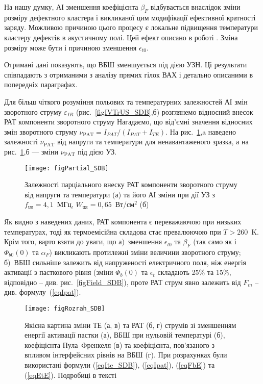 На нашу думку, АІ зменшення коефіцієнта $\beta_F$ відбувається внаслідок зміни розміру дефектного кластера і викликаної цим
модифікації ефективної кратності заряду.
Можливою причиною цього процесу є локальне підвищення температури кластеру дефектів в акустичному полі.
Цей ефект описано в роботі \cite{MirzadeJAP2011}.
Зміна розміру може бути і причиною зменшення $\epsilon_{t0}$.

Отримані дані показують, що ВБШ зменшується під дією УЗН.
Ці результати співпадають з отриманими з аналізу прямих гілок ВАХ і детально описаними в попередніх параграфах.

Для більш чіткого розуміння польових та температурних залежностей АІ змін зворотного струму $\varepsilon_{IR}$ (рис.~\ref{figIVTrUS_SDB},б)
розглянемо відносний внесок РАТ компоненти зворотного струму
Нагадаємо, що від'ємні значення відносних змін зворотного струму
$\nu_\mathrm{PAT}=I_{P\!AT}/(I_{P\!AT}+I_{TE})$.
На рис.~\ref{figPartial_SDB},a наведено залежності $\nu_\mathrm{PAT}$ від напруги та температури для ненавантаженого зразка,
а на рис.~\ref{figPartial_SDB},б --- зміни $\nu_\mathrm{PAT}$ під дією УЗ.


\begin{figure}
\center
\texttt{[image: figPartial\_SDB]}
\caption{\label{figPartial_SDB}
Залежності парціального внеску РАТ компоненти зворотного струму від напруги та температури (а)
та його АІ зміни при дії УЗ з $f_\mathtt{US}=4,1$~МГц, $W_\mathtt{US}=0,65$~Вт/см$^2$ (б)
}%
\end{figure}

Як видно з наведених даних, РАТ компонента є переважаючою при низьких температурах, тоді як термоемісійна складова стає превалюючою при $T>260$~K.
Крім того, варто взяти до уваги, що
а)~зменшення $\epsilon_{t0}$ та $\beta_F$ (так само як і $\Phi_{b0}(0)$ та $\alpha_F$) викликають протилежні зміни величини зворотного струму;
б)~ВБШ сильніше залежить від напруженості електричного поля, ніж енергія активації з пасткового рівня
(зміни $\Phi_{b}(0)$ та $\epsilon_t$ складають 25\% та 15\%, відповідно -- див. рис.~\ref{figField_SDB}),
проте РАТ струм явно залежить від $F_m$ -- див. формулу~(\ref{eqIpat}).



\begin{figure}
\center
\texttt{[image: figRozrah\_SDB]}
\caption{\label{figRozrah_SDB}
Якісна картина зміни ТЕ (а, в) та РАТ (б, г) струмів зі зменшенням енергії активації пастки (а),
ВБШ при нульовій температурі (б),
коефіцієнта Пула--Френкеля (в)
та коефіцієнта, пов'язаного з впливом інтерфейсних рівнів на ВБШ (г).
При розрахунках були використані формули (\ref{eqIte_SDB}), (\ref{eqIpat}), (\ref{eqFbE}) та (\ref{eqEtE}).
Подробиці в тексті
}%
\end{figure}

